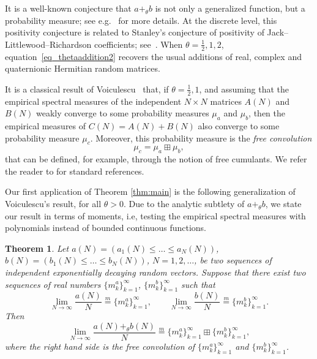 \documentclass[11pt]{article}
\theoremstyle{plain}
\newtheorem{theorem}[lemma]{Theorem}
\begin{document}
It is a well-known conjecture that $a+_\theta b$ is not only a generalized function, but a probability measure; see e.g.~\cite{A} for more details. At the discrete level, this positivity conjecture is related to Stanley's conjecture of positivity of Jack--Littlewood--Richardson coefficients; see~\cite{S}. When $\theta=\frac{1}{2},1,2$, equation~\eqref{eq_thetaaddition2} recovers the usual additions of real, complex and quaternionic Hermitian random matrices. 

It is a classical result of Voiculescu~\cite{Voi91} that, if $\theta=\frac{1}{2},1$, and assuming that the empirical spectral measures of the independent $N\times N$  matrices $A(N)$ and $B(N)$ weakly converge to some probability measures $\mu_a$ and $\mu_b$, then the empirical measures of $C(N)=A(N)+B(N)$ also converge to some probability measure $\mu_c$. Moreover, this probability measure is the \emph{free convolution}
$$\mu_{c}=\mu_a\boxplus\mu_b,$$
that can be defined, for example, through the notion of free cumulants. We refer the reader to \cite{MS,NS} for standard references.

Our first application of Theorem \ref{thm:main} is the following generalization of Voiculescu's result, for all $\theta>0$. Due to the analytic subtlety of $a+_{\theta}b$, we state our result in terms of moments, i.e, testing the empirical spectral measures with polynomials instead of bounded continuous functions.



\begin{theorem}\label{thm:beta_addition}
    Let $a(N)=(a_1(N)\le\dots\le a_N(N))$, $b(N)=(b_1(N)\le\dots\le b_N(N))$, $N=1,2,\dots$, be two sequences of independent exponentially decaying random vectors. Suppose that there exist two sequences of real numbers $\{m_{k}^{a}\}_{k=1}^{\infty}$, $\{m_{k}^{b}\}_{k=1}^{\infty}$ such that
    \[
    \lim_{N\to\infty}{\frac{a(N)}{N}} \stackrel{m}{=} \{m_{k}^{a}\}_{k=1}^{\infty},\qquad
    \lim_{N\to\infty}{\frac{b(N)}{N}} \stackrel{m}{=} \{m_{k}^{b}\}_{k=1}^{\infty}.
    \]
    Then
    \[
    \lim_{N\to\infty}{\frac{a(N) +_\theta b(N)}{N}} \stackrel{m}{=} \{m_{k}^{a}\}_{k=1}^{\infty} \boxplus \{m_{k}^{b}\}_{k=1}^{\infty},
    \]
    where the right hand side is the free convolution of $ \{m_{k}^{a}\}_{k=1}^{\infty}$ and $\{m_{k}^{b}\}_{k=1}^{\infty}$.
\end{theorem}
\end{document}
